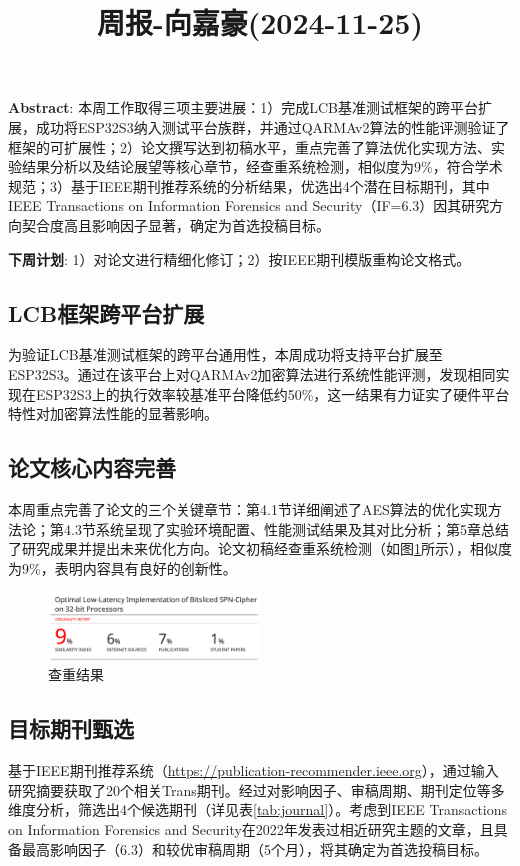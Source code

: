 \documentclass[11pt,a4paper]{article}
\title{周报-向嘉豪(2024-11-25)}
\renewcommand{\maketitle}{
  \begin{center}
    \LARGE\bfseries\thetitle
  \end{center}
}
\begin{document}
\maketitle


\noindent \textbf{Abstract}: 本周工作取得三项主要进展：1）完成LCB基准测试框架的跨平台扩展，成功将ESP32S3纳入测试平台族群，并通过QARMAv2算法的性能评测验证了框架的可扩展性；2）论文撰写达到初稿水平，重点完善了算法优化实现方法、实验结果分析以及结论展望等核心章节，经查重系统检测，相似度为9\%，符合学术规范；3）基于IEEE期刊推荐系统的分析结果，优选出4个潜在目标期刊，其中IEEE Transactions on Information Forensics and Security（IF=6.3）因其研究方向契合度高且影响因子显著，确定为首选投稿目标。

\noindent \textbf{下周计划}: 1）对论文进行精细化修订；2）按IEEE期刊模版重构论文格式。

\subsection{LCB框架跨平台扩展}
为验证LCB基准测试框架的跨平台通用性，本周成功将支持平台扩展至ESP32S3。通过在该平台上对QARMAv2加密算法进行系统性能评测，发现相同实现在ESP32S3上的执行效率较基准平台降低约50\%，这一结果有力证实了硬件平台特性对加密算法性能的显著影响。

\subsection{论文核心内容完善}
本周重点完善了论文的三个关键章节：第4.1节详细阐述了AES算法的优化实现方法论；第4.3节系统呈现了实验环境配置、性能测试结果及其对比分析；第5章总结了研究成果并提出未来优化方向。论文初稿经查重系统检测（如图\ref{fig:check}所示），相似度为9\%，表明内容具有良好的创新性。

\begin{figure}[h]
  \centering
  \includegraphics[width=0.5\textwidth]{./fig/duplicate_9.png}
  \caption{查重结果}
  \label{fig:check}
\end{figure}

\subsection{目标期刊甄选}
基于IEEE期刊推荐系统（\url{https://publication-recommender.ieee.org}），通过输入研究摘要获取了20个相关Trans期刊。经过对影响因子、审稿周期、期刊定位等多维度分析，筛选出4个候选期刊（详见表\ref{tab:journal}）。考虑到IEEE Transactions on Information Forensics and Security在2022年发表过相近研究主题的文章，且具备最高影响因子（6.3）和较优审稿周期（5个月），将其确定为首选投稿目标。
\end{document}
